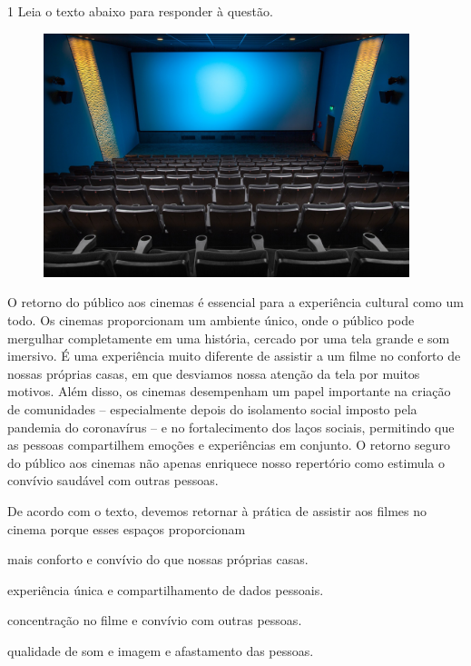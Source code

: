 \num{1} Leia o texto abaixo para responder à questão.

\begin{myquote}

\begin{figure}[H]
\centering
\includegraphics[width=0.95\textwidth]{./imgSAEB_7_POR/media/image42.png}
\end{figure}

O retorno do público aos cinemas é essencial para a experiência cultural como
um todo. Os cinemas proporcionam um ambiente único, onde o público pode
mergulhar completamente em uma história, cercado por uma tela grande e som
imersivo. É uma experiência muito diferente de assistir a um filme 
no conforto de nossas próprias casas, em que desviamos nossa atenção da tela 
por muitos motivos. Além disso, os cinemas desempenham um papel importante 
na criação de comunidades -- especialmente depois do isolamento social imposto 
pela pandemia do coronavírus -- e no fortalecimento dos laços sociais, permitindo 
que as pessoas compartilhem emoções e experiências em conjunto. O retorno seguro 
do público aos cinemas não apenas enriquece nosso repertório como estimula o convívio
saudável com outras pessoas.


\end{myquote}

De acordo com o texto, devemos retornar à prática de assistir aos filmes 
no cinema porque esses espaços proporcionam

\begin{escolha}

  \item mais conforto e convívio do que nossas próprias casas.

  \item experiência única e compartilhamento de dados pessoais. 

  \item concentração no filme e convívio com outras pessoas.

  \item qualidade de som e imagem e afastamento das pessoas. 

\end{escolha}

